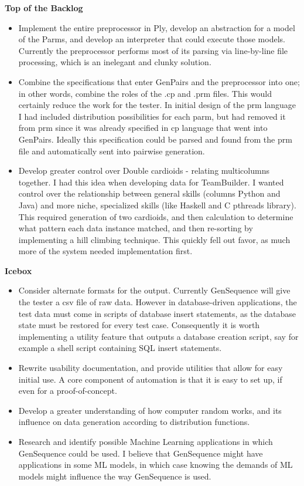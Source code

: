 \textbf{Top of the Backlog}
\begin{itemize}
\item Implement the entire preprocessor in Ply, develop an abstraction for a model of the Parms, and develop an interpreter that could execute those models. Currently the preprocessor performs most of its parsing via line-by-line file processing, which is an inelegant and clunky solution.
\item Combine the specifications that enter GenPairs and the preprocessor into one; in other words, combine the roles of the .cp and .prm files. This would certainly reduce the work for the tester. In initial design of the prm language I had included distribution possibilities for each parm, but had removed it from prm since it was already specified in cp language that went into GenPairs. Ideally this specification could be parsed and found from the prm file and automatically sent into pairwise generation.
\item Develop greater control over Double cardioids - relating multicolumns together. I had this idea when developing data for TeamBuilder. I wanted control over the relationship between general skills (columns Python and Java) and more niche, specialized skills (like Haskell and C pthreads library). This required generation of two cardioids, and then calculation to determine what pattern each data instance matched, and then re-sorting by implementing a hill climbing technique. This quickly fell out favor, as much more of the system needed implementation first.
\end{itemize}

\textbf{Icebox}
\begin{itemize}
\item Consider alternate formats for the output. Currently GenSequence will give the tester a csv file of raw data. However in database-driven applications, the test data must come in scripts of database insert statements, as the database state must be restored for every test case. Consequently it is worth implementing a utility feature that outputs a database creation script, say for example a shell script containing SQL insert statements.
\item Rewrite usability documentation, and provide utilities that allow for easy initial use. A core component of automation is that it is easy to set up, if even for a proof-of-concept.
\item Develop a greater understanding of how computer random works, and its influence on data generation according to distribution functions.
\item Research and identify possible Machine Learning applications in which GenSequence could be used. I believe that GenSequence might have applications in some ML models, in which case knowing the demands of ML models might influence the way GenSequence is used.
\end{itemize}


